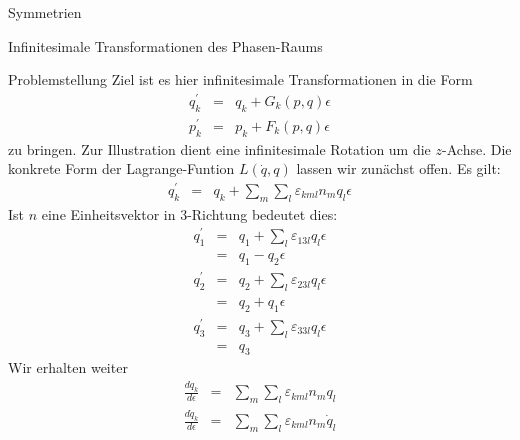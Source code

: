 \documentclass[a4paper,fleqn]{article}
\numberwithin{equation}{section}
\begin{document}
\begin{section}{Symmetrien}
\begin{subsection}{Infinitesimale Transformationen des Phasen-Raums}
\begin{subsubsection}{Problemstellung}
Ziel ist es hier infinitesimale Transformationen in die Form
\begin{eqnarray*}
q^\prime_k &=& q_k+G_k(p,q)\epsilon\\
p^\prime_k &=& p_k+F_k(p,q)\epsilon
\end{eqnarray*}
zu bringen.
Zur Illustration dient eine infinitesimale Rotation um die $z$-Achse. Die konkrete Form der Lagrange-Funtion $L(\dot{q},q)$ lassen wir zunächst offen. Es gilt:
\begin{eqnarray*}
q_k^\prime &=& q_k+\sum_m\sum_l\varepsilon_{kml}n_mq_l\epsilon
\end{eqnarray*}
Ist $n$ eine Einheitsvektor in $3$-Richtung bedeutet dies:
\begin{eqnarray*}
q_1^\prime &=& q_1+\sum_l\varepsilon_{13l}q_l\epsilon\\
&=& q_1-q_2\epsilon\\
q_2^\prime &=& q_2+\sum_l\varepsilon_{23l}q_l\epsilon\\
&=& q_2+q_1\epsilon\\
q_3^\prime &=& q_3+\sum_l\varepsilon_{33l}q_l\epsilon\\
&=& q_3
\end{eqnarray*}
Wir erhalten weiter
\begin{eqnarray*}
\frac{dq_k}{d\epsilon} &=& \sum_m\sum_l\varepsilon_{kml}n_mq_l\\
\frac{d\dot{q}_k}{d\epsilon} &=& \sum_m\sum_l\varepsilon_{kml}n_m\dot{q}_l
\end{eqnarray*}

\end{subsubsection}


\end{subsection}
\end{section}
\end{document}
